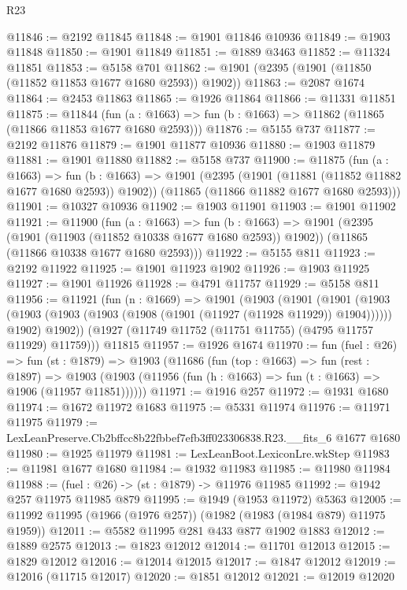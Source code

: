 \begin{lexlean}{R23}
\begin{coremodule}
@11846 := @2192 @11845
@11848 := @1901 @11846 @10936
@11849 := @1903 @11848
@11850 := @1901 @11849
@11851 := @1889 @3463
@11852 := @11324 @11851
@11853 := @5158 @701
@11862 := @1901 (@2395 (@1901 (@11850 (@11852 @11853 @1677 @1680 @2593)) @1902))
@11863 := @2087 @1674
@11864 := @2453 @11863
@11865 := @1926 @11864
@11866 := @11331 @11851
@11875 := @11844
    (fun (a : @1663) => fun (b : @1663) => @11862 (@11865 (@11866 @11853 @1677 @1680 @2593)))
@11876 := @5155 @737
@11877 := @2192 @11876
@11879 := @1901 @11877 @10936
@11880 := @1903 @11879
@11881 := @1901 @11880
@11882 := @5158 @737
@11900 := @11875
    (fun (a : @1663) =>
    fun (b : @1663) =>
    @1901
      (@2395 (@1901 (@11881 (@11852 @11882 @1677 @1680 @2593)) @1902))
      (@11865 (@11866 @11882 @1677 @1680 @2593)))
@11901 := @10327 @10936
@11902 := @1903 @11901
@11903 := @1901 @11902
@11921 := @11900
    (fun (a : @1663) =>
    fun (b : @1663) =>
    @1901
      (@2395 (@1901 (@11903 (@11852 @10338 @1677 @1680 @2593)) @1902))
      (@11865 (@11866 @10338 @1677 @1680 @2593)))
@11922 := @5155 @811
@11923 := @2192 @11922
@11925 := @1901 @11923 @1902
@11926 := @1903 @11925
@11927 := @1901 @11926
@11928 := @4791 @11757
@11929 := @5158 @811
@11956 := @11921
    (fun (n : @1669) =>
    @1901
      (@1903
        (@1901
          (@1901
            (@1903 (@1903 (@1903 (@1903 (@1908 (@1901 (@11927 (@11928 @11929)) @1904))))))
            @1902)
          @1902))
      (@1927 (@11749 @11752 (@11751 @11755) (@4795 @11757 @11929) @11759)))
    @11815
@11957 := @1926 @1674
@11970 := fun (fuel : @26) =>
  fun (st : @1879) =>
  @1903
    (@11686
      (fun (top : @1663) =>
      fun (rest : @1897) =>
      @1903 (@1903 (@11956 (fun (h : @1663) => fun (t : @1663) => @1906 (@11957 @11851))))))
@11971 := @1916 @257
@11972 := @1931 @1680
@11974 := @1672 @11972 @1683
@11975 := @5331 @11974
@11976 := @11971 @11975
@11979 := LexLeanPreserve.Cb2bffcc8b22fbbef7efb3ff023306838.R23.__fits_6 @1677 @1680
@11980 := @1925 @11979
@11981 := LexLeanBoot.LexiconLre.wkStep
@11983 := @11981 @1677 @1680
@11984 := @1932 @11983
@11985 := @11980 @11984
@11988 := (fuel : @26) -> (st : @1879) -> @11976 @11985
@11992 := @1942 @257 @11975 @11985 @879
@11995 := @1949 (@1953 @11972) @5363
@12005 := @11992 @11995 (@1966 (@1976 @257)) (@1982 (@1983 (@1984 @879) @11975 @1959))
@12011 := @5582 @11995 @281 @433 @877 @1902 @1883
@12012 := @1889 @2575
@12013 := @1823 @12012
@12014 := @11701 @12013
@12015 := @1829 @12012
@12016 := @12014 @12015
@12017 := @1847 @12012
@12019 := @12016 (@11715 @12017)
@12020 := @1851 @12012
@12021 := @12019 @12020

\end{coremodule}
\end{lexlean}
